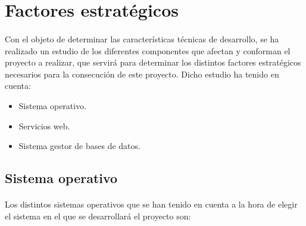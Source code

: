 \section{Factores estratégicos}\label{facEst}

\paragraph{}Con el objeto de determinar las características técnicas de
desarrollo, se ha realizado un estudio de los diferentes componentes que afectan
y conforman el proyecto a realizar, que servirá para determinar los distintos
factores estratégicos necesarios para la consecución de este proyecto. Dicho
estudio ha tenido en cuenta:

\begin{itemize}
 \item Sistema operativo.
 \item Servicios web.
 \item Sistema gestor de bases de datos.
\end{itemize}

\subsection{Sistema operativo}
   \paragraph{}Los distintos sistemas operativos que se han tenido en cuenta a
   la hora de elegir el sistema en el que se desarrollará el proyecto son:

